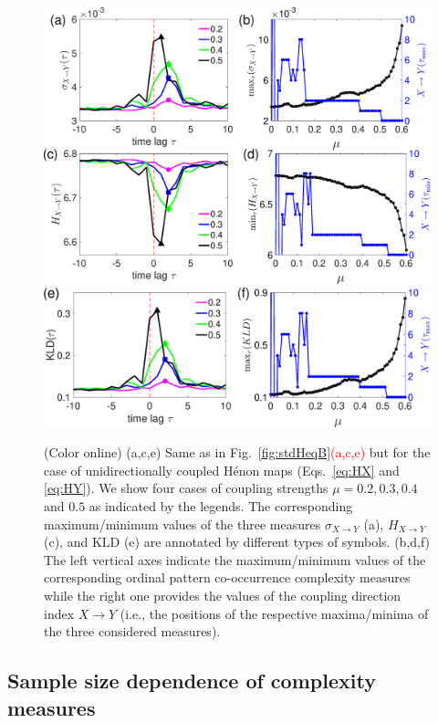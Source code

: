 \documentclass[12pt,aip,cha,reprint,nofootinbib]{revtex4-1}
\begin{document}
\begin{figure}
	\centering
	\includegraphics[width=\columnwidth]{henonMaps.eps}
	\includegraphics[width=\columnwidth]{henon_KL.eps}
\caption{(Color online) (a,c,e) Same as in Fig.~\ref{fig:stdHeqB}\textcolor{red}{(a,c,e)} but for the case of unidirectionally coupled H\'enon maps (Eqs.~\eqref{eq:HX} and \eqref{eq:HY}). We show four cases of coupling strengths $\mu = 0.2, 0.3, 0.4$ and $0.5$ as indicated by the legends. The corresponding maximum/minimum values of the three measures $\sigma_{X \to Y}$ (a), $H_{X \to Y}$ (c), and $\text{KLD}$ (e) are annotated by different types of symbols. (b,d,f) The left vertical axes indicate the maximum/minimum values of the corresponding ordinal pattern co-occurrence complexity measures while the right one provides the values of the coupling direction index $X \to Y$ (i.e., the positions of the respective maxima/minima of the three considered measures). \label{fig:stdHeqXY}}
\end{figure}


\subsection{Sample size dependence of complexity measures}
\end{document}
